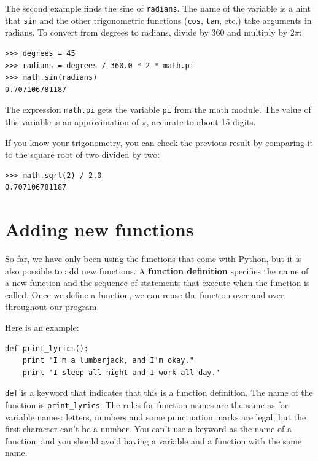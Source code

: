 \documentclass[10pt]{book}
\begin{document}

The second example finds the sine of {\tt radians}.  The name of the
variable is a hint that {\tt sin} and the other trigonometric
functions ({\tt cos}, {\tt tan}, etc.)  take arguments in radians. To
convert from degrees to radians, divide by 360 and multiply by $2
\pi$:

\beforeverb
\begin{verbatim}
>>> degrees = 45
>>> radians = degrees / 360.0 * 2 * math.pi
>>> math.sin(radians)
0.707106781187
\end{verbatim}
\afterverb
%
The expression {\tt math.pi} gets the variable {\tt pi} from the math
module.  The value of this variable is an approximation
of $\pi$, accurate to about 15 digits.


If you know
your trigonometry, you can check the previous result by comparing it to
the square root of two divided by two:


\beforeverb
\begin{verbatim}
>>> math.sqrt(2) / 2.0
0.707106781187
\end{verbatim}
\afterverb
%


\section{Adding new functions}

So far, we have only been using the functions that come with Python,
but it is also possible to add new functions.
A {\bf function definition} specifies the name of a new function and
the sequence of statements that execute when the function is called.
Once we define a function, we can reuse the function over and over 
throughout our program.


Here is an example:

\beforeverb
\begin{verbatim}
def print_lyrics():
    print "I'm a lumberjack, and I'm okay."
    print 'I sleep all night and I work all day.'
\end{verbatim}
\afterverb
%
{\tt def} is a keyword that indicates that this is a function
definition.  The name of the function is \verb"print_lyrics".  The
rules for function names are the same as for variable names: letters,
numbers and some punctuation marks are legal, but the first character
can't be a number.  You can't use a keyword as the name of a function,
and you should avoid having a variable and a function with the same
name.
\end{document}
